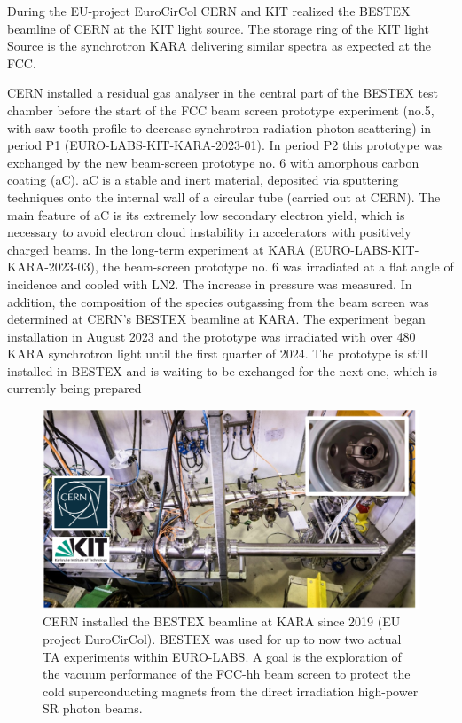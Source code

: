During the EU-project EuroCirCol CERN and KIT realized the BESTEX beamline of CERN at the KIT light source. The storage ring of the KIT light Source is the synchrotron KARA delivering similar spectra as expected at the FCC.

CERN installed a residual gas analyser in the central part of the BESTEX test chamber  before the start of the FCC beam screen prototype experiment (no.5, with saw-tooth profile to decrease synchrotron radiation photon scattering) in period P1 (EURO-LABS-KIT-KARA-2023-01). In period P2 this prototype was exchanged by the new beam-screen prototype no. 6 with amorphous carbon coating (aC). aC is a stable and inert material, deposited via sputtering techniques onto the internal wall of a circular tube (carried out at CERN).  The main feature of aC is its extremely low secondary electron yield, which is necessary to avoid electron cloud instability in accelerators with positively charged beams. In the long-term experiment at KARA (EURO-LABS-KIT-KARA-2023-03), the beam-screen prototype no. 6 was irradiated at a flat angle of incidence and cooled with LN2. The increase in pressure was measured. In addition, the composition of the species outgassing from the beam screen was determined at CERN's BESTEX beamline at KARA. The experiment began installation in August 2023 and the prototype was irradiated with over 480 KARA synchrotron light until the first quarter of 2024. The prototype is still installed in BESTEX and is waiting to be exchanged for the next one, which is currently being prepared
\begin{figure}[!h]
    \centering
    \includegraphics[width=0.75\linewidth]{graphics/wp3-KIT_BESTEX.png}
    \caption{CERN installed the BESTEX beamline at KARA since 2019 (EU project EuroCirCol). BESTEX was used for up to now two actual TA experiments within EURO-LABS. A goal is the exploration of the vacuum performance of the FCC-hh beam screen to protect the cold superconducting magnets from the 
direct irradiation high-power SR photon beams.
}    
    \label{fig:kit_bestex}
\end{figure}

